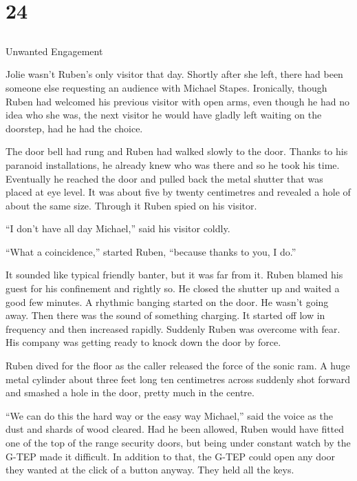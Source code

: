 \chapter{24}
\section{}
Unwanted Engagement  

Jolie wasn't Ruben's only visitor that day.  Shortly after she left, there had been someone else requesting an audience with Michael Stapes.  Ironically, though Ruben had welcomed his previous visitor with open arms, even though he had no idea who she was, the next visitor he would have gladly left waiting on the doorstep, had he had the choice.

The door bell had rung and Ruben had walked slowly to the door.  Thanks to his paranoid installations, he already knew who was there and so he took his time.  Eventually he reached the door and pulled back the metal shutter that was placed at eye level.  It was about five by twenty centimetres and revealed a hole of about the same size.  Through it Ruben spied on his visitor.  

``I don't have all day Michael,'' said his visitor coldly.

``What a coincidence,'' started Ruben, ``because thanks to you, I do.''  

It sounded like typical friendly banter, but it was far from it.  Ruben blamed his guest for his confinement and rightly so.  He closed the shutter up and waited a good few minutes.  A rhythmic banging started on the door.  He wasn't going away.  Then there was the sound of something charging.  It started off low in frequency and then increased rapidly.  Suddenly Ruben was overcome with fear.  His company was getting ready to knock down the door by force.  

Ruben dived for the floor as the caller released the force of the sonic ram.  A huge metal cylinder about three feet long ten centimetres across suddenly shot forward and smashed a hole in the door, pretty much in the centre.

``We can do this the hard way or the easy way Michael,'' said the voice as the dust and shards of wood cleared.  Had he been allowed, Ruben would have fitted one of the top of the range security doors, but being under constant watch by the G-TEP made it difficult.  In addition to that, the G-TEP could open any door they wanted at the click of a button anyway.  They held all the keys.

